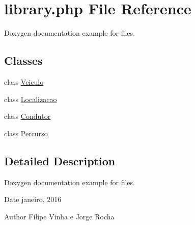 \hypertarget{library_8php}{}\section{library.\+php File Reference}
\label{library_8php}


Doxygen documentation example for files.  


\subsection*{Classes}
\begin{DoxyCompactItemize}
\item 
class \hyperlink{class_veiculo}{Veiculo}
\item 
class \hyperlink{class_localizacao}{Localizacao}
\item 
class \hyperlink{class_condutor}{Condutor}
\item 
class \hyperlink{class_percurso}{Percurso}
\end{DoxyCompactItemize}


\subsection{Detailed Description}
Doxygen documentation example for files. 

\begin{DoxyDate}{Date}
janeiro, 2016 
\end{DoxyDate}
\begin{DoxyAuthor}{Author}
Filipe Vinha e Jorge Rocha 
\end{DoxyAuthor}
